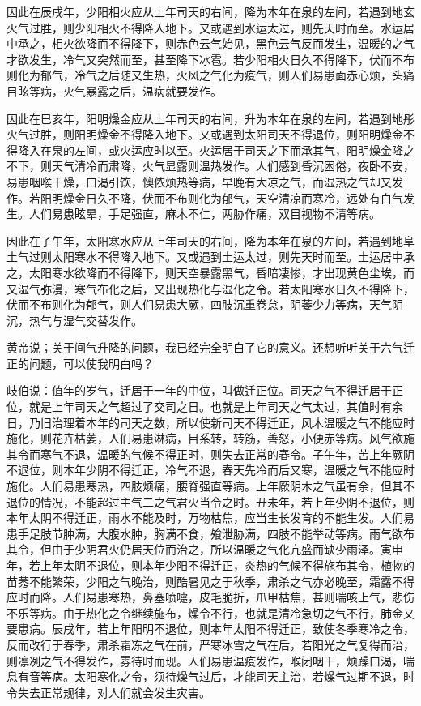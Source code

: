 \documentclass[a4paper,12pt,UTF8,twoside]{ctexbook}
\begin{document}
因此在辰戌年，少阳相火应从上年司天的右间，降为本年在泉的左间，若遇到地玄火气过胜，则少阳相火不得降入地下。又或遇到水运太过，则先天时而至。水运居中承之，相火欲降而不得降下，则赤色云气始见，黑色云气反而发生，温暖的之气才欲发生，冷气又突然而至，甚至降下冰雹。若少阳相火日久不得降下，伏而不布则化为郁气，冷气之后随又生热，火风之气化为疫气，则人们易患面赤心烦，头痛目眩等病，火气暴露之后，温病就要发作。

因此在巳亥年，阳明燥金应从上年司天的右间，升为本年在泉的左间，若遇到地彤火气过胜，则阳明燥金不得降入地下。又或遇到太阳司天不得退位，则阳明燥金不得降入在泉的左间，或火运应时以至。火运居于司天之下而承其气，阳明燥金降之不下，则天气清冷而肃降，火气显露则温热发作。人们感到昏沉困倦，夜卧不安，易患咽喉干燥，口渴引饮，懊侬烦热等病，早晚有大凉之气，而湿热之气却又发作。若阳明燥金日久不降，伏而不布则化为郁气，天空清凉而寒冷，远处有白气发生。人们易患眩晕，手足强直，麻木不仁，两胁作痛，双目视物不清等病。

因此在子午年，太阳寒水应从上年司天的右间，降为本年在泉的左间，若遇到地阜土气过则太阳寒水不得降入地下。又或遇到土运太过，则先天时而至。土运居中承之，太阳寒水欲降而不得降下，则天空暴露黑气，昏暗凄惨，才出现黄色尘埃，而又湿气弥漫，寒气布化之后，又出现热化与湿化之令。若太阳寒水日久不得降下，伏而不布则化为郁气，则人们易患大厥，四肢沉重卷怠，阴萎少力等病，天气阴沉，热气与湿气交替发作。

黄帝说；关于间气升降的问题，我已经完全明白了它的意义。还想听听关于六气迁正的问题，可以使我明白吗？

岐伯说：值年的岁气，迁居于一年的中位，叫做迁正位。司天之气不得迁居于正位，就是上年司天之气超过了交司之日。也就是上年司天之气太过，其值时有余日，乃旧治理着本年的司天之数，所以使新司天不得迁正，风木温暖之气不能应时施化，则花卉枯萎，人们易患淋病，目系转，转筋，善怒，小便赤等病。风气欲施其令而寒气不退，温暖的气候不得正时，则失去正常的春令。子午年，苦上年厥阴不退位，则本年少阴不得迁正，冷气不退，春天先冷而后又寒，温暖之气不能应时施化。人们易患寒热，四肢烦痛，腰脊强直等病。上年厥阴木之气虽有余，但其不退位的情况，不能超过主气二之气君火当令之时。丑未年，若上年少阴不退位，则本年太阴不得迁正，雨水不能及时，万物枯焦，应当生长发育的不能生发。人们易患手足肢节肿满，大腹水肿，胸满不食，飧泄胁满，四肢不能举动等病。雨气欲布其令，但由于少阴君火仍居天位而治之，所以温暖之气化亢盛而缺少雨泽。寅申年，若上年太阴不退位，则本年少阳不得迁正，炎热的气候不得施布其令，植物的苗莠不能繁荣，少阳之气晚治，则酷暑见之于秋季，肃杀之气亦必晚至，霜露不得应时而降。人们易患寒热，鼻塞喷嚏，皮毛脆折，爪甲枯焦，甚则喘咳上气，悲伤不乐等病。由于热化之令继续施布，燥令不行，也就是清冷急切之气不行，肺金又要患病。辰戌年，若上年阳明不退位，则本年太阳不得迁正，致使冬季寒冷之令，反而改行于春季，肃杀霜冻之气在前，严寒冰雪之气在后，若阳光之气复得而治，则凛冽之气不得发作，雰待时而现。人们易患温疫发作，喉闭咽干，烦躁口渴，喘息有音等病。太阳寒化之令，须待燥气过后，才能司天主治，若燥气过期不退，时令失去正常规律，对人们就会发生灾害。
\end{document}
